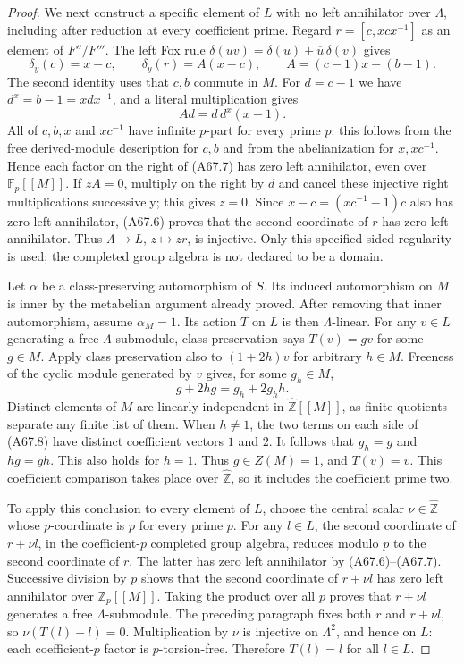 \begin{proof}
We next construct a specific element of $L$
with no left annihilator over $\Lambda$,
including after reduction at every coefficient
prime. Regard
$r=[c,xcx^{-1}]$ as an element of
$F''/F'''$.
The left Fox rule
$\delta(uv)=\delta(u)+\overline u\,\delta(v)$
gives
\[
 \delta_y(c)=x-c,\qquad
 \delta_y(r)=A(x-c),\qquad
 A=(c-1)x-(b-1).
                                                        \tag{A67.6}
\]
The second identity uses that $c,b$ commute
in $M$. For $d=c-1$ we have
$d^x=b-1=xdx^{-1}$, and a literal multiplication
gives
\[
                   A d=d\,d^x(x-1).                   \tag{A67.7}
\]
All of $c,b,x$ and $xc^{-1}$ have infinite
$p$-part for every prime $p$:
this follows from the free derived-module
description for $c,b$ and from the
abelianization for $x,xc^{-1}$.
Hence each factor on the right of (A67.7)
has zero left annihilator, even over
$\mathbb F_p[[M]]$.
If $zA=0$, multiply on the right by $d$
and cancel these injective right
multiplications successively; this gives
$z=0$. Since $x-c=(xc^{-1}-1)c$ also has
zero left annihilator, (A67.6) proves that
the second coordinate of $r$ has zero
left annihilator. Thus
$\Lambda\to L$, $z\mapsto zr$, is injective.
Only this specified sided regularity is used;
the completed group algebra is not declared
to be a domain.

Let $\alpha$ be a class-preserving automorphism
of $S$. Its induced automorphism on $M$ is
inner by the metabelian argument already proved.
After removing that inner automorphism, assume
$\alpha_M=1$.
Its action $T$ on $L$ is then $\Lambda$-linear.
For any $v\in L$ generating a free
$\Lambda$-submodule, class preservation says
$T(v)=g v$ for some $g\in M$.
Apply class preservation also to
$(1+2h)v$ for arbitrary $h\in M$.
Freeness of the cyclic module generated by
$v$ gives, for some $g_h\in M$,
\[
                    g+2hg=g_h+2g_hh.                  \tag{A67.8}
\]
Distinct elements of $M$ are linearly
independent in $\widehat{\mathbb Z}[[M]]$,
as finite quotients separate any finite
list of them. When $h\ne1$, the two terms
on each side of (A67.8) have distinct
coefficient vectors $1$ and $2$.
It follows that $g_h=g$ and $hg=gh$.
This also holds for $h=1$.
Thus $g\in Z(M)=1$, and $T(v)=v$.
This coefficient comparison takes place
over $\widehat{\mathbb Z}$, so it includes
the coefficient prime two.

To apply this conclusion to every element
of $L$, choose the central scalar
$\nu\in\widehat{\mathbb Z}$ whose
$p$-coordinate is $p$ for every prime $p$.
For any $l\in L$, the second coordinate
of $r+\nu l$, in the coefficient-$p$
completed group algebra, reduces modulo
$p$ to the second coordinate of $r$.
The latter has zero left annihilator by
(A67.6)--(A67.7).
Successive division by $p$ shows that
the second coordinate of $r+\nu l$ has
zero left annihilator over
$\mathbb Z_p[[M]]$.
Taking the product over all $p$ proves
that $r+\nu l$ generates a free
$\Lambda$-submodule.
The preceding paragraph fixes both $r$
and $r+\nu l$, so $\nu(T(l)-l)=0$.
Multiplication by $\nu$ is injective
on $\Lambda^2$, and hence on $L$:
each coefficient-$p$ factor is
$p$-torsion-free.
Therefore $T(l)=l$ for all $l\in L$.


\end{proof}
